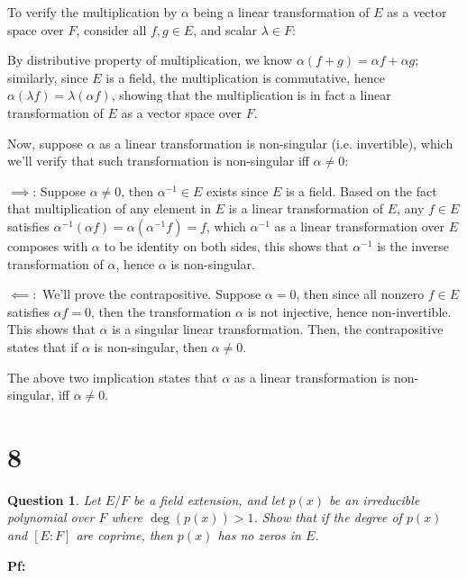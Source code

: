 \documentclass{article}
\newtheorem{question}{Question}
\begin{document}
To verify the multiplication by $\alpha$ being a linear transformation of $E$ as a vector space over $F$, consider all $f,g\in E$, and scalar $\lambda\in F$:

By distributive property of multiplication, we know $\alpha(f+g)=\alpha f+\alpha g$; similarly, since $E$ is a field, the multiplication is commutative, hence $\alpha(\lambda f)=\lambda (\alpha f)$,
showing that the multiplication is in fact a linear transformation of $E$ as a vector space over $F$.

\hfil

Now, suppose $\alpha$ as a linear transformation is non-singular (i.e. invertible), which we'll verify that such transformation is non-singular iff $\alpha\neq 0$:

$\implies$: Suppose $\alpha\neq 0$, then $\alpha^{-1}\in E$ exists since $E$ is a field. Based on the fact that multiplication of any element in $E$ is a linear transformation of $E$,
any $f\in E$ satisfies $\alpha^{-1}(\alpha f) = \alpha(\alpha^{-1}f)=f$, which $\alpha^{-1}$ as a linear transformation over $E$ composes with $\alpha$ to be identity on both sides,
this shows that $\alpha^{-1}$ is the inverse transformation of $\alpha$, hence $\alpha$ is non-singular.

$\impliedby:$ We'll prove the contrapositive. Suppose $\alpha=0$, then since all nonzero $f\in E$ satisfies $\alpha f = 0$, then the transformation $\alpha$ is not injective,
hence non-invertible. This shows that $\alpha$ is a singular linear transformation.
Then, the contrapositive states that if $\alpha$ is non-singular, then $\alpha\neq 0$.

The above two implication states that $\alpha$ as a linear transformation is non-singular, iff $\alpha\neq 0$.

\break

\section*{8}
\begin{myBox}[]{}
    \begin{question}
        Let $E/F$ be a field extension, and let $p(x)$ be an irreducible polynomial over $F$ where $\deg(p(x))>1$. 
        Show that if the degree of $p(x)$ and $[E:F]$ are coprime, then $p(x)$ has no zeros in $E$.
    \end{question}
\end{myBox}

\textbf{Pf:}
\end{document}
